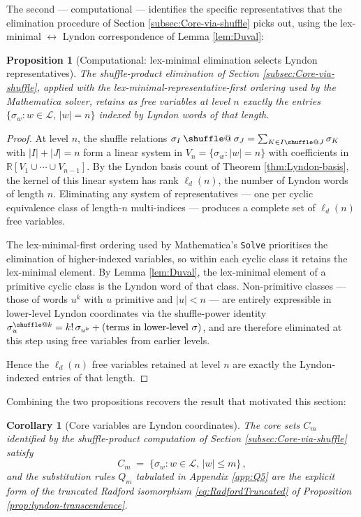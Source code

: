 \documentclass[12pt,english]{article}
\makeatletter
\providecommand*{\shuffle}{\mathbin{\mathpalette\shuffle@{}}}
\newcommand*{\shuffle@}[2]{%
  \sbox0{$#1\vcenter{}$}%
  \kern .15\ht0
  \rlap{\vrule height .25\ht0 depth 0pt width 2.5\ht0}%
  \raise.1\ht0\hbox to 2.5\ht0{%
    \vrule height 1.75\ht0 depth -.1\ht0 width .17\ht0
    \hfill
    \vrule height 1.75\ht0 depth -.1\ht0 width .17\ht0
    \hfill
    \vrule height 1.75\ht0 depth -.1\ht0 width .17\ht0}%
  \kern .15\ht0
}
\newtheorem{proposition}[theorem]{Proposition}
\newtheorem{corollary}[theorem]{Corollary}
\theoremstyle{remark}
\makeatother
\begin{document}
The second --- computational --- identifies the specific representatives
that the elimination procedure of Section \ref{subsec:Core-via-shuffle}
picks out, using the lex-minimal $\leftrightarrow$ Lyndon correspondence
of Lemma \ref{lem:Duval}:

\begin{proposition}[Computational: lex-minimal elimination selects Lyndon representatives]
\label{prop:elimination-lyndon}
The shuffle-product elimination of Section \ref{subsec:Core-via-shuffle},
applied with the lex-minimal-representative-first ordering used by
the Mathematica solver, retains as free variables at level $n$ exactly
the entries $\{\sigma_{w}:w\in\mathcal{L},\,|w|=n\}$ indexed by Lyndon
words of that length.
\end{proposition}

\begin{proof}
At level $n$, the shuffle relations $\sigma_{I}\shuffle\sigma_{J}=\sum_{K\in I\shuffle J}\sigma_{K}$
with $|I|+|J|=n$ form a linear system in $V_{n}=\{\sigma_{w}:|w|=n\}$
with coefficients in $\mathbb{R}[V_{1}\cup\cdots\cup V_{n-1}]$. By
the Lyndon basis count of Theorem \ref{thm:Lyndon-basis}, the kernel
of this linear system has rank $\ell_{d}(n)$, the number of Lyndon
words of length $n$. Eliminating any system of representatives ---
one per cyclic equivalence class of length-$n$ multi-indices ---
produces a complete set of $\ell_{d}(n)$ free variables.

The lex-minimal-first ordering used by Mathematica's \texttt{Solve}
prioritises the elimination of higher-indexed variables, so within
each cyclic class it retains the lex-minimal element. By Lemma \ref{lem:Duval},
the lex-minimal element of a primitive cyclic class is the Lyndon
word of that class. Non-primitive classes --- those of words $u^{k}$
with $u$ primitive and $|u|<n$ --- are entirely expressible in lower-level
Lyndon coordinates via the shuffle-power identity $\sigma_{u}^{\shuffle k}=k!\,\sigma_{u^{k}}+(\text{terms in lower-level }\sigma)$,
and are therefore eliminated at this step using free variables from
earlier levels.

Hence the $\ell_{d}(n)$ free variables retained at level $n$ are
exactly the Lyndon-indexed entries of that length.
\end{proof}

Combining the two propositions recovers the result that motivated
this section:

\begin{corollary}[Core variables are Lyndon coordinates]
\label{prop:core-is-lyndon}
The core sets $C_{m}$ identified by the shuffle-product computation
of Section \ref{subsec:Core-via-shuffle} satisfy
\[
C_{m}\;=\;\{\sigma_{w}:w\in\mathcal{L},\,|w|\leq m\}\,,
\]
and the substitution rules $Q_{m}$ tabulated in Appendix \ref{app:Q5}
are the explicit form of the truncated Radford isomorphism \eqref{eq:RadfordTruncated}
of Proposition \ref{prop:lyndon-transcendence}.
\end{corollary}
\end{document}
